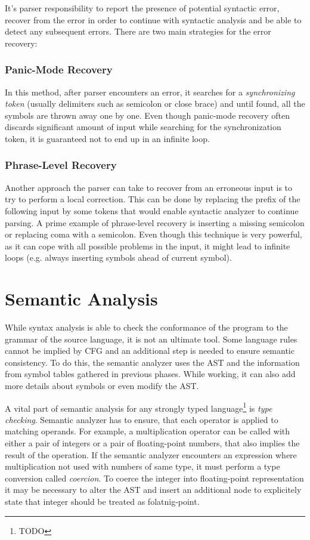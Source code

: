 \documentclass[
  digital, %
  table,   %
  lof,     %
  lot,     %
  oneside,
]{fithesis3}
\begin{document}
It's parser responsibility to report the presence of potential syntactic error, recover from the error in order to continue with syntactic analysis and be able to detect any subsequent errors. There are two main strategies for the error recovery:

  \subsubsection{Panic-Mode Recovery}
In this method, after parser encounters an error, it searches for a \textit{synchronizing token} (usually delimiters such as semicolon or close brace) and until found, all the symbols are thrown away one by one. Even though panic-mode recovery often discards significant amount of input while searching for the synchronization token, it is guaranteed not to end up in an infinite loop.

  \subsubsection{Phrase-Level Recovery}
Another approach the parser can take to recover from an erroneous input is to try to perform a local correction. This can be done by replacing the prefix of the following input by some tokens that would enable syntactic analyzer to continue parsing. A prime example of phrase-level recovery is inserting a missing semicolon or replacing coma with a semicolon. Even though this technique is very powerful, as it can cope with all possible problems in the input, it might lead to infinite loops (e.g. always inserting symbols ahead of current symbol).

  \section{Semantic Analysis}
While syntax analysis is able to check the conformance of the program to the grammar of the source language, it is not an ultimate tool. Some language rules cannot be implied by CFG and an additional step is needed to ensure semantic consistency. To do this, the semantic analyzer uses the AST and the information from symbol tables gathered in previous phases. While working, it can also add more details about symbols or even modify the AST. 

A vital part of semantic analysis for any strongly typed language\footnote{TODO} is \textit{type checking}. Semantic analyzer has to ensure, that each operator is applied to matching operands. For example, a multiplication operator can be called with either a pair of integers or a pair of floating-point numbers, that also implies the result of the operation. If the semantic analyzer encounters an expression where multiplication not used with numbers of same type, it must perform a type conversion called \textit{coercion}. To coerce the integer into floating-point representation it may be necessary to alter the AST and insert an additional node to explicitely state that integer should be treated as folatnig-point. 
\end{document}
